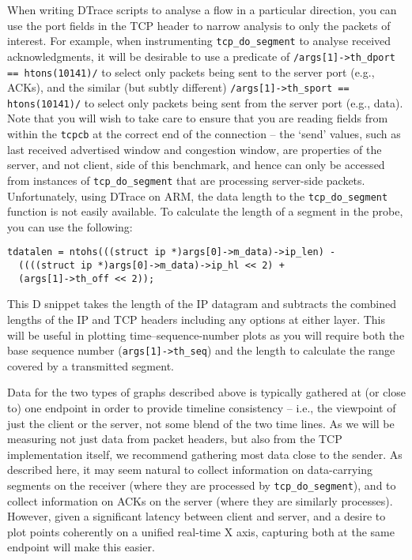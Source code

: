 \documentclass[a4paper,10pt]{article}
\begin{document}
When writing DTrace scripts to analyse a flow in a particular direction, you
can use the port fields in the TCP header to narrow analysis to only the
packets of interest.
For example, when instrumenting \texttt{tcp\_do\_segment} to analyse received
acknowledgments, it will be desirable to use a predicate of
\texttt{/args[1]->th\_dport == htons(10141)/} to select only packets being
sent to the server port (e.g., ACKs), and the similar (but subtly different)
\texttt{/args[1]->th\_sport == htons(10141)/} to select only packets being
sent from the server port (e.g., data).
Note that you will wish to take care to ensure that you are reading fields
from within the \texttt{tcpcb} at the correct end of the connection -- the
`send' values, such as last received advertised window and congestion window,
are properties of the server, and not client, side of this benchmark, and
hence can only be accessed from instances of \texttt{tcp\_do\_segment} that
are processing server-side packets.
Unfortunately, using DTrace on ARM, the data length to the \texttt{tcp\_do\_segment} function is not easily available.
To calculate the length of a segment in the probe, you can use the following:

\begin{verbatim}
tdatalen = ntohs(((struct ip *)args[0]->m_data)->ip_len) -
  ((((struct ip *)args[0]->m_data)->ip_hl << 2) +
  (args[1]->th_off << 2));
\end{verbatim}

This D snippet takes the length of the IP datagram and subtracts the combined
lengths of the IP and TCP headers including any options at either layer.
This will be useful in plotting time--sequence-number plots as you will
require both the base sequence number (\texttt{args[1]->th\_seq}) and the
length to calculate the range covered by a transmitted segment.

Data for the two types of graphs described above is typically gathered at (or
close to) one endpoint in order to provide timeline consistency -- i.e., the
viewpoint of just the client or the server, not some blend of the two
time lines.
As we will be measuring not just data from packet headers, but also from the
TCP implementation itself, we recommend gathering most data close to the
sender.
As described here, it may seem natural to collect information on data-carrying
segments on the receiver (where they are processed by
\texttt{tcp\_do\_segment}), and to collect information on ACKs on the server
(where they are similarly processes).
However, given a significant latency between client and server, and a desire
to plot points coherently on a unified real-time X axis, capturing both at the
same endpoint will make this easier.
\end{document}
